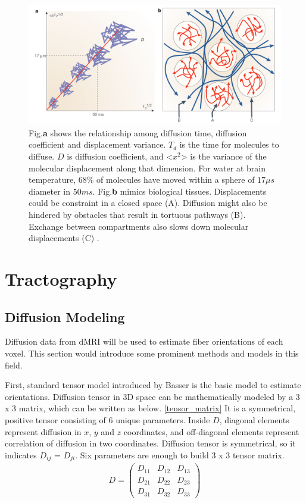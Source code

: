 \begin{figure}[ht]
    \centering
    \includegraphics[width= 12cm]{figures/brownian_motion.png}
        \caption{Fig.\textbf{a} shows the relationship among diffusion time, diffusion coefficient and displacement variance.
        ${T_d}$ is the time for molecules to diffuse. $D$ is diffusion coefficient, 
        and <${x^2}$> is the variance of the molecular displacement along that dimension. 
        For water at brain temperature, $68\%$ of molecules have moved within a sphere of $17 \mu s$ diameter in $50 ms$.
        Fig.\textbf{b} mimics biological tissues. Displacements could be constraint in a closed space (A).
        Diffusion might also be hindered by obstacles that result in tortuous pathways (B).
        Exchange between compartments also slows down molecular displacements (C) \cite*{lebihanLookingFunctionalArchitecture2003}.
        }
    \label{fig:brownian}
\end{figure}


\section{Tractography}
\subsection{Diffusion Modeling}

Diffusion data from dMRI will be used to estimate fiber orientations of each voxel. 
This section would introduce some prominent methods and models in this field.

First, standard tensor model introduced by Basser \cite*{Qof40e4TmpElsevier} is the basic model to estimate orientations.
Diffusion tensor in 3D space can be mathematically modeled by a 3 x 3 matrix, which can be written as below. \ref*{tensor_matrix} 
It is a symmetrical, positive tensor consisting of 6 unique parameters. 
Inside $D$, diagonal elements represent diffusion in $x$, $y$ and $z$ coordinates, 
and off-diagonal elements represent correlation of diffusion in two coordinates. 
Diffusion tensor is symmetrical, so it indicates $D_{ij}$ = $D_{ji}$.
Six parameters are enough to build 3 x 3 tensor matrix. 
\begin{gather}\label{tensor_matrix}
    D = 
    \begin{pmatrix}
        D_{11} & D_{12} & D_{13} \\
        D_{21} & D_{22} & D_{23} \\
        D_{31} & D_{32} & D_{33} 
    \end{pmatrix}
\end{gather}

